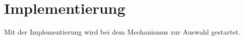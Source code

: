\section{Implementierung}
Mit der Implementierung wird bei dem Mechanismus zur Auswahl gestartet.


%
%
%
%




